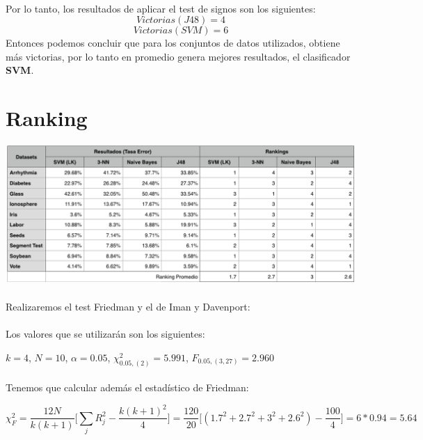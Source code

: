 \documentclass[10pt, a4paper,spanish]{article}
\begin{document}
		\paragraph{}
		Por lo tanto, los resultados de aplicar el test de signos son los siguientes:
		\[Victorias(J48) = 4\]
		\[Victorias(SVM) = 6\]
		Entonces podemos concluir que para los conjuntos de datos utilizados, obtiene más victorias, por lo tanto en promedio genera mejores resultados, el clasificador \textbf{SVM}.

	\section{Ranking}

		\begin{center}
			\includegraphics[width=\textwidth]{ranking-table}
		\end{center}

		\paragraph{}
		Realizaremos el test Friedman y el de Iman y Davenport:

		\paragraph{}
		Los valores que se utilizarán son los siguientes:

		$k = 4$, $N =10$,
		$\alpha = 0.05$,
		$\chi_{0.05,(2)}^2= 5.991$,
		$F_{0.05, (3,27)} =  2.960$

		\paragraph{}
		Tenemos que calcular además el estadístico de Friedman:

		\[
		\chi_{F}^2 = \frac{12N}{k(k+1)}\Big[\displaystyle\sum_{j}R_{j}^2 - \frac{k(k+1)^2}{4}\Big] = \frac{120}{20}\Big[(1.7^2+ 2.7^2+3^2+2.6^2) - \frac{100}{4}\Big] = 6 * 0.94 = 5.64\]
\end{document}
